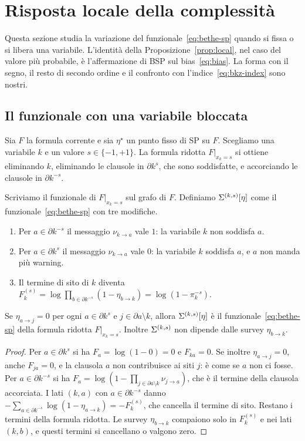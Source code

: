 \section{Risposta locale della complessità}
\label{sec:response}

Questa sezione studia la variazione del funzionale~\eqref{eq:bethe-sp} quando si fissa o si libera una variabile.
L'identità della Proposizione~\ref{prop:local}, nel caso del valore più probabile, è l'affermazione di BSP sul bias~\eqref{eq:bias}.
La forma con il segno, il resto di secondo ordine e il confronto con l'indice~\eqref{eq:bkz-index} sono nostri.

\subsection{Il funzionale con una variabile bloccata}

Sia $F$ la formula corrente e sia $\eta^\star$ un punto fisso di SP su $F$.
Scegliamo una variabile $k$ e un valore $s\in\{-1,+1\}$.
La formula ridotta $F|_{x_k=s}$ si ottiene eliminando $k$, eliminando le clausole in $\partial k^{s}$, che sono soddisfatte, e accorciando le clausole in $\partial k^{-s}$.

Scriviamo il funzionale di $F|_{x_k=s}$ sul grafo di $F$.
Definiamo $\Sigma^{(k,s)}[\eta]$ come il funzionale~\eqref{eq:bethe-sp} con tre modifiche.
\begin{enumerate}
\item Per $a\in\partial k^{-s}$ il messaggio $\nu_{k\to a}$ vale $1$: la variabile $k$ non soddisfa $a$.
\item Per $a\in\partial k^{s}$ il messaggio $\nu_{k\to a}$ vale $0$: la variabile $k$ soddisfa $a$, e $a$ non manda più warning.
\item Il termine di sito di $k$ diventa $F_k^{(s)}=\log\prod_{b\in\partial k^{-s}}(1-\eta_{b\to k})=\log(1-\pi_k^{-s})$.
\end{enumerate}

\begin{lemma}
\label{lem:clamped}
Se $\eta_{a\to j}=0$ per ogni $a\in\partial k^{s}$ e $j\in\partial a\setminus k$, allora $\Sigma^{(k,s)}[\eta]$ è il funzionale~\eqref{eq:bethe-sp} della formula ridotta $F|_{x_k=s}$.
Inoltre $\Sigma^{(k,s)}$ non dipende dalle survey $\eta_{b\to k}$.
\end{lemma}

\begin{proof}
Per $a\in\partial k^{s}$ si ha $F_a=\log(1-0)=0$ e $F_{ka}=0$.
Se inoltre $\eta_{a\to j}=0$, anche $F_{ja}=0$, e la clausola $a$ non contribuisce ai siti $j$: è come se $a$ non ci fosse.
Per $a\in\partial k^{-s}$ si ha $F_a=\log(1-\prod_{j\in\partial a\setminus k}\nu_{j\to a})$, che è il termine della clausola accorciata.
I lati $(k,a)$ con $a\in\partial k^{-s}$ danno $-\sum_{a\in\partial k^{-s}}\log(1-\eta_{a\to k})=-F_k^{(s)}$, che cancella il termine di sito.
Restano i termini della formula ridotta.
Le survey $\eta_{b\to k}$ compaiono solo in $F_k^{(s)}$ e nei lati $(k,b)$, e questi termini si cancellano o valgono zero.
\end{proof}

